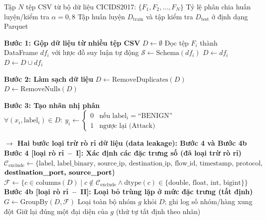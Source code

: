 \begin{algorithm}[htbp]
\caption{Tiền xử lý dữ liệu CICIDS2017}
\label{data_preparation_ag}
\begin{algorithmic}[1]
\Require Tập $N$ tệp CSV từ bộ dữ liệu CICIDS2017: $\{F_1, F_2, \dots, F_N\}$
\Statex \qquad Tỷ lệ phân chia huấn luyện/kiểm tra $\alpha = 0{,}8$
\Ensure Tập huấn luyện $D_{\text{train}}$ và tập kiểm tra $D_{\text{test}}$ ở định dạng Parquet

\State \textbf{Bước 1: Gộp dữ liệu từ nhiều tệp CSV}
\State $D \gets \emptyset$
    \State Đọc tệp $F_i$ thành DataFrame $df_i$ với lược đồ suy luận tự động
    \State {} 
    \State {} 
        \State $\mathcal{S} \gets \text{Schema}(df_i)$ 
        \State $D \gets df_i$
    \Else
        \State {} 
        \State $D \gets D \cup df_i$ 
    \EndIf
\EndFor

\State \textbf{Bước 2: Làm sạch dữ liệu}
\State $D \gets \text{RemoveDuplicates}(D)$ 
\State $D \gets \text{RemoveNulls}(D)$ 

\State \textbf{Bước 3: Tạo nhãn nhị phân}
\State $\forall (x_i, \text{label}_i) \in D: \ y_i \gets \begin{cases} 0 & \text{nếu label}_i = \text{``BENIGN''} \\ 1 & \text{ngược lại (Attack)} \end{cases}$

\Statex \textcolor{accRed}{\textbf{$\rightarrow$ Hai bước loại trừ rò rỉ dữ liệu (data leakage): Bước 4 và Bước 4b}}
\State \textbf{Bước 4 [loại rò rỉ~--~I]: Xác định các đặc trưng số (đã loại trừ rò rỉ)}
\State $\mathcal{C}_{\text{exclude}} \gets \{\text{label, label\_binary, source\_ip, destination\_ip, flow\_id, timestamp, protocol,}$
\Statex \qquad\qquad $\text{\textbf{destination\_port, source\_port}}\}$ 
\State $\mathcal{F} \gets \{c \in \text{columns}(D) \mid c \notin \mathcal{C}_{\text{exclude}} \wedge \text{dtype}(c) \in \{\text{double, float, int, bigint}\}\}$
\State \textbf{Bước 4b [loại rò rỉ~--~II]: Loại bỏ trùng lặp ở mức đặc trưng (tất định)}
\State $G \gets \text{GroupBy}(D, \mathcal{F})$ 
     
        \State Loại toàn bộ nhóm $g$ khỏi $D$; ghi log số nhóm/hàng xung đột
    \Else
        \State Giữ lại đúng một đại diện của $g$ (thứ tự tất định theo nhãn)
    \EndIf
\EndFor


\end{algorithmic}
\end{algorithm}
